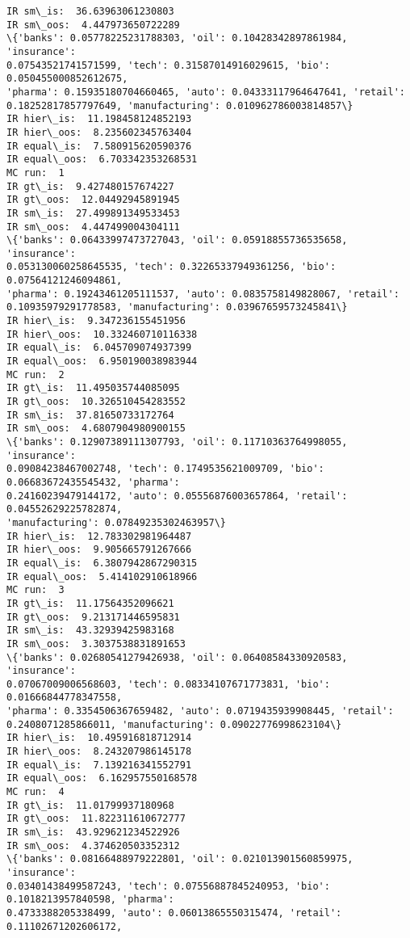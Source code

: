 \documentclass[11pt]{article}
\begin{document}
    \begin{Verbatim}[commandchars=\\\{\},fontsize=\footnotesize]
IR sm\_is:  36.63963061230803
IR sm\_oos:  4.447973650722289
\{'banks': 0.05778225231788303, 'oil': 0.10428342897861984, 'insurance':
0.07543521741571599, 'tech': 0.31587014916029615, 'bio': 0.050455000852612675,
'pharma': 0.15935180704660465, 'auto': 0.04333117964647641, 'retail':
0.18252817857797649, 'manufacturing': 0.010962786003814857\}
IR hier\_is:  11.198458124852193
IR hier\_oos:  8.235602345763404
IR equal\_is:  7.580915620590376
IR equal\_oos:  6.703342353268531
MC run:  1
IR gt\_is:  9.427480157674227
IR gt\_oos:  12.04492945891945
IR sm\_is:  27.499891349533453
IR sm\_oos:  4.447499004304111
\{'banks': 0.06433997473727043, 'oil': 0.05918855736535658, 'insurance':
0.053130060258645535, 'tech': 0.32265337949361256, 'bio': 0.07564121246094861,
'pharma': 0.19243461205111537, 'auto': 0.0835758149828067, 'retail':
0.10935979291778583, 'manufacturing': 0.03967659573245841\}
IR hier\_is:  9.347236155451956
IR hier\_oos:  10.332460710116338
IR equal\_is:  6.045709074937399
IR equal\_oos:  6.950190038983944
MC run:  2
IR gt\_is:  11.495035744085095
IR gt\_oos:  10.326510454283552
IR sm\_is:  37.81650733172764
IR sm\_oos:  4.6807904980900155
\{'banks': 0.12907389111307793, 'oil': 0.11710363764998055, 'insurance':
0.09084238467002748, 'tech': 0.1749535621009709, 'bio': 0.06683672435545432, 'pharma':
0.24160239479144172, 'auto': 0.05556876003657864, 'retail': 0.04552629225782874,
'manufacturing': 0.07849235302463957\}
IR hier\_is:  12.783302981964487
IR hier\_oos:  9.905665791267666
IR equal\_is:  6.3807942867290315
IR equal\_oos:  5.414102910618966
MC run:  3
IR gt\_is:  11.17564352096621
IR gt\_oos:  9.213171446595831
IR sm\_is:  43.32939425983168
IR sm\_oos:  3.3037538831891653
\{'banks': 0.02680541279426938, 'oil': 0.06408584330920583, 'insurance':
0.07067009006568603, 'tech': 0.08334107671773831, 'bio': 0.01666844778347558,
'pharma': 0.3354506367659482, 'auto': 0.0719435939908445, 'retail':
0.2408071285866011, 'manufacturing': 0.09022776998623104\}
IR hier\_is:  10.495916818712914
IR hier\_oos:  8.243207986145178
IR equal\_is:  7.139216341552791
IR equal\_oos:  6.162957550168578
MC run:  4
IR gt\_is:  11.01799937180968
IR gt\_oos:  11.822311610672777
IR sm\_is:  43.929621234522926
IR sm\_oos:  4.374620503352312
\{'banks': 0.08166488979222801, 'oil': 0.021013901560859975, 'insurance':
0.03401438499587243, 'tech': 0.07556887845240953, 'bio': 0.1018213957840598, 'pharma':
0.4733388205338499, 'auto': 0.06013865550315474, 'retail': 0.11102671202606172,

\end{Verbatim}
\end{document}
